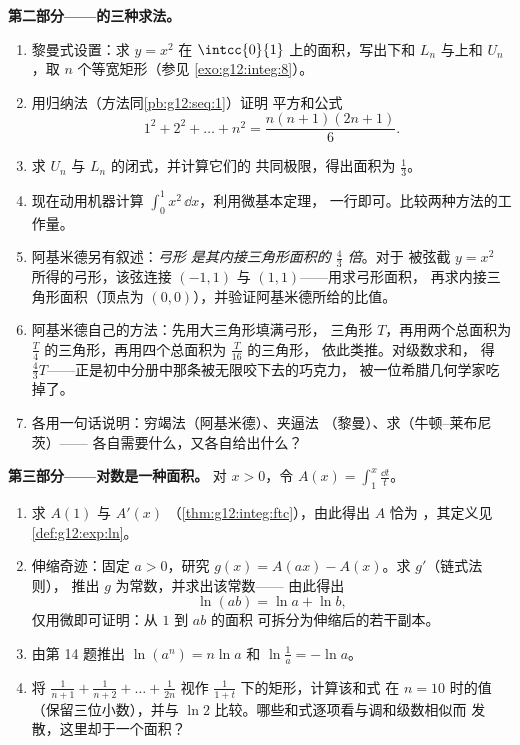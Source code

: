 \begin{problem}
\medskip
\noindent\textbf{第二部分——的三种求法。}
\begin{enumerate}[resume]
  \item 黎曼式设置：求 $y = x^2$ 在
        $\intcc{0}{1}$ 上的面积，写出下和 $L_n$ 与上和
        $U_n$，取 $n$ 个等宽矩形（参见
        \cref{exo:g12:integ:8}）。
  \item 用归纳法（方法同\cref{pb:g12:seq:1}）证明
        平方和公式
        \[
        1^2 + 2^2 + \dots + n^2 = \frac{n(n+1)(2n+1)}{6} .
        \]
  \item 求 $U_n$ 与 $L_n$ 的闭式，并计算它们的
        共同极限，得出面积为 $\frac13$。
  \item 现在动用机器计算
        $\int_0^1 x^2\,\dd x$，利用微基本定理，
        一行即可。比较两种方法的工作量。
  \item 阿基米德另有叙述：\emph{弓形
        是其内接三角形面积的 $\frac43$ 倍}。对于
        被弦截 $y = x^2$ 所得的弓形，该弦连接
        $(-1, 1)$ 与 $(1, 1)$——用求弓形面积，
        再求内接三角形面积（顶点为
        $(0, 0)$），并验证阿基米德所给的比值。
  \item 阿基米德自己的方法：先用大三角形填满弓形，
        三角形 $T$，再用两个总面积为
        $\frac T4$ 的三角形，再用四个总面积为 $\frac{T}{16}$ 的三角形，
        依此类推。对级数求和，
        得 $\frac43 T$——正是初中分册中那条被无限咬下去的巧克力，
        被一位希腊几何学家吃掉了。
  \item 各用一句话说明：穷竭法（阿基米德）、夹逼法
        （黎曼）、求（牛顿--莱布尼茨）——
        各自需要什么，又各自给出什么？
\end{enumerate}

\medskip
\noindent\textbf{第三部分——对数是一种面积。}
对 $x > 0$，令
$A(x) = \displaystyle\int_1^x \frac{\dd t}{t}$。
\begin{enumerate}[resume]
  \item 求 $A(1)$ 与 $A'(x)$
        （\cref{thm:g12:integ:ftc}），由此得出 $A$ 恰为
        ，其定义见
        \cref{def:g12:exp:ln}。
  \item 伸缩奇迹：固定 $a > 0$，研究
        $g(x) = A(ax) - A(x)$。求 $g'$（链式法则），
        推出 $g$ 为常数，并求出该常数——
        由此得出
        \[
        \ln(ab) = \ln a + \ln b ,
        \]
        仅用微即可证明：从 $1$ 到 $ab$ 的面积
        可拆分为伸缩后的若干副本。
  \item 由第 14 题推出 $\ln(a^n) = n\ln a$ 和
        $\ln\frac1a = -\ln a$。
  \item {} 将
        $\frac{1}{n+1} + \frac{1}{n+2} + \dots + \frac{1}{2n}$
        视作 $\frac{1}{1 + t}$ 下的矩形，计算该和式
        在 $n = 10$ 时的值（保留三位小数），并与
        $\ln 2$ 比较。哪些和式逐项看与调和级数相似而
        发散，这里却于一个面积？
\end{enumerate}


\end{problem}
